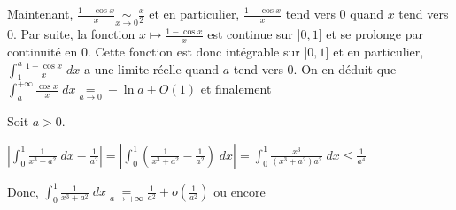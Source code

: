 {{Maintenant, $\frac{1-\cos x}{x}\underset{x\rightarrow0}{\sim}\frac{x}{2}$ et en particulier, $\frac{1-\cos x}{x}$ tend vers $0$ quand $x$ tend vers $0$. Par suite, la fonction $x\mapsto\frac{1-\cos x}{x}$ est continue sur $]0,1]$ et  se prolonge par continuité en $0$. Cette fonction est donc intégrable sur $]0,1]$ et en particulier, $\int_{1}^{a}\frac{1-\cos x}{x}\;dx$ a une limite réelle quand $a$ tend vers $0$. On en déduit que $\int_{a}^{+\infty}\frac{\cos x}{x}\;dx\underset{a\rightarrow0}{=}-\ln a + O(1)$ et finalement

\begin{center}
\end{center}
Soit $a>0$.

\begin{center}
$\left|\int_{0}^{1}\frac{1}{x^3+a^2}\;dx -\frac{1}{a^2}\right| =\left|\int_{0}^{1}\left(\frac{1}{x^3+a^2}-\frac{1}{a^2}\right)\;dx\right| =\int_{0}^{1}\frac{x^3}{(x^3+a^2)a^2}\;dx\leqslant\frac{1}{a^4}$
\end{center}

Donc, $\int_{0}^{1}\frac{1}{x^3+a^2}\;dx\underset{a\rightarrow+\infty}{=}\frac{1}{a^2}+o\left(\frac{1}{a^2}\right)$ ou encore

\begin{center}
\end{center}
}
}
